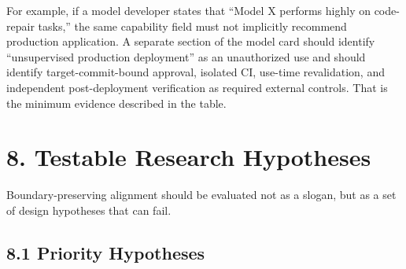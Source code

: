 For example, if a model developer states that ``Model X performs highly on code-repair tasks,'' the same capability field must not implicitly recommend production application. A separate section of the model card should identify ``unsupervised production deployment'' as an unauthorized use and should identify target-commit-bound approval, isolated CI, use-time revalidation, and independent post-deployment verification as required external controls. That is the minimum evidence described in the table.


\section{8. Testable Research Hypotheses}\label{testable-research-hypotheses}

Boundary-preserving alignment should be evaluated not as a slogan, but as a set of design hypotheses that can fail.

\subsection{8.1 Priority Hypotheses}\label{priority-hypotheses}

